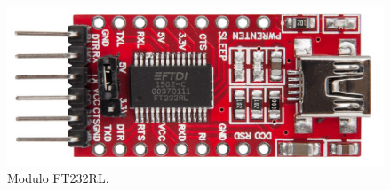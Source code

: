 \begin{figure}[H]
\centering
\includegraphics[scale=0.2]{images/ftdi.jpg}
\caption{Modulo FT232RL.}
\end{figure}
